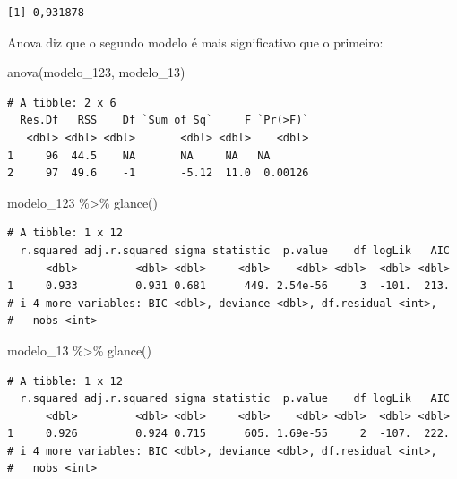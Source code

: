 \documentclass[
  letterpaper,
  DIV=11,
  numbers=noendperiod]{scrreprt}
\newenvironment{Shaded}{\begin{snugshade}}{\end{snugshade}}
\newcommand{\FunctionTok}[1]{\textcolor[rgb]{0.28,0.35,0.67}{#1}}
\newcommand{\NormalTok}[1]{\textcolor[rgb]{0.00,0.23,0.31}{#1}}
\newcommand{\SpecialCharTok}[1]{\textcolor[rgb]{0.37,0.37,0.37}{#1}}
\begin{document}
\begin{verbatim}
[1] 0,931878
\end{verbatim}

Anova diz que o segundo modelo é mais significativo que o primeiro:

\begin{Shaded}
\begin{Highlighting}[]
\FunctionTok{anova}\NormalTok{(modelo\_123, modelo\_13)}
\end{Highlighting}
\end{Shaded}

\begin{verbatim}
# A tibble: 2 x 6
  Res.Df   RSS    Df `Sum of Sq`     F `Pr(>F)`
   <dbl> <dbl> <dbl>       <dbl> <dbl>    <dbl>
1     96  44.5    NA       NA     NA   NA      
2     97  49.6    -1       -5.12  11.0  0.00126
\end{verbatim}

\begin{Shaded}
\begin{Highlighting}[]
\NormalTok{modelo\_123 }\SpecialCharTok{\%\textgreater{}\%} \FunctionTok{glance}\NormalTok{()}
\end{Highlighting}
\end{Shaded}

\begin{verbatim}
# A tibble: 1 x 12
  r.squared adj.r.squared sigma statistic  p.value    df logLik   AIC
      <dbl>         <dbl> <dbl>     <dbl>    <dbl> <dbl>  <dbl> <dbl>
1     0.933         0.931 0.681      449. 2.54e-56     3  -101.  213.
# i 4 more variables: BIC <dbl>, deviance <dbl>, df.residual <int>,
#   nobs <int>
\end{verbatim}

\begin{Shaded}
\begin{Highlighting}[]
\NormalTok{modelo\_13 }\SpecialCharTok{\%\textgreater{}\%} \FunctionTok{glance}\NormalTok{()}
\end{Highlighting}
\end{Shaded}

\begin{verbatim}
# A tibble: 1 x 12
  r.squared adj.r.squared sigma statistic  p.value    df logLik   AIC
      <dbl>         <dbl> <dbl>     <dbl>    <dbl> <dbl>  <dbl> <dbl>
1     0.926         0.924 0.715      605. 1.69e-55     2  -107.  222.
# i 4 more variables: BIC <dbl>, deviance <dbl>, df.residual <int>,
#   nobs <int>
\end{verbatim}
\end{document}
